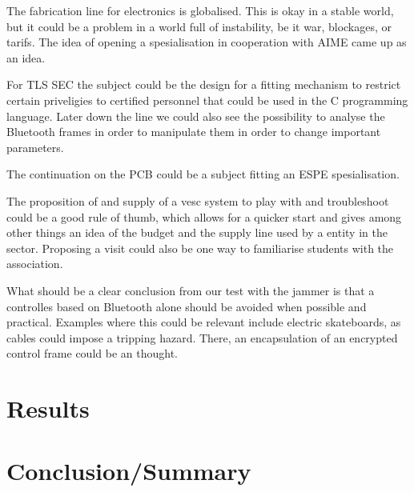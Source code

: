 \documentclass[conference]{IEEEtran}
\begin{document}
The fabrication line for electronics is globalised. This is okay in a stable world, but it could be a problem in a world 
full of instability, be it war, blockages, or tarifs. The idea of opening a spesialisation in cooperation with AIME came 
up as an idea.

For TLS SEC the subject could be the design for a fitting mechanism to restrict certain priveligies to certified 
personnel that could be used in the C programming language. Later down the line we could also see the possibility to 
analyse the Bluetooth frames in order to manipulate them in order to change important parameters.

The continuation on the PCB could be a subject fitting an ESPE spesialisation.

The proposition of and supply of a vesc system to play with and troubleshoot could be a good rule of thumb, which 
allows for a quicker start and gives among other things an idea of the budget and the supply line used by a entity 
in the sector. Proposing a visit could also be one way to familiarise students with the association.

What should be a clear conclusion from our test with the jammer is that a controlles based on Bluetooth alone should be 
avoided when possible and practical. Examples where this could be relevant include electric skateboards, as cables could 
impose a tripping hazard. There, an encapsulation of an encrypted control frame could be an thought. 

\section{Results}

\section{Conclusion/Summary}


\end{document}
